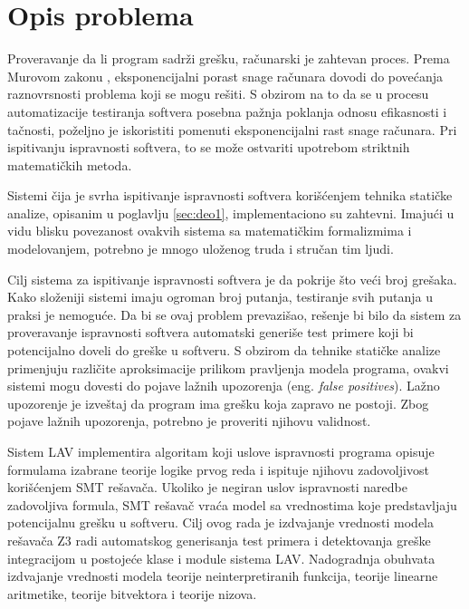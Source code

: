 \documentclass[12pt,oneside]{memoir}
\begin{document}
\section{Opis problema} \label{sec:deo3}
Proveravanje da li program sadrži grešku, računarski je zahtevan proces. Prema Murovom zakonu \cite{Moore}, eksponencijalni porast snage računara dovodi do povećanja raznovrsnosti problema koji se mogu rešiti. 
S obzirom na to da se u procesu automatizacije testiranja softvera posebna pažnja poklanja odnosu efikasnosti i tačnosti, poželjno je iskoristiti pomenuti eksponencijalni rast snage računara. Pri ispitivanju ispravnosti softvera, to se može ostvariti upotrebom striktnih matematičkih metoda.
\par
Sistemi čija je svrha ispitivanje ispravnosti softvera korišćenjem tehnika statičke analize, opisanim u poglavlju \ref{sec:deo1}, implementaciono su zahtevni. Imajući u vidu blisku povezanost ovakvih sistema sa matematičkim formalizmima i modelovanjem, potrebno je mnogo uloženog truda i stručan tim ljudi. 
\par 
Cilj sistema za ispitivanje ispravnosti softvera je da pokrije što veći broj grešaka. Kako složeniji sistemi imaju ogroman broj putanja, testiranje svih putanja u praksi je nemoguće. Da bi se ovaj problem prevazišao, rešenje bi bilo da sistem za proveravanje ispravnosti softvera automatski generiše test primere koji bi potencijalno doveli do greške u softveru. S obzirom da tehnike statičke analize primenjuju različite aproksimacije prilikom pravljenja modela programa, ovakvi sistemi mogu dovesti do pojave lažnih upozorenja (eng. \textit{false positives}). Lažno upozorenje je izveštaj da program ima grešku koja zapravo ne postoji. Zbog pojave lažnih upozorenja, potrebno je proveriti njihovu validnost.
\par
Sistem LAV implementira algoritam koji uslove ispravnosti programa opisuje formulama izabrane teorije logike prvog reda i ispituje njihovu zadovoljivost korišćenjem SMT rešavača. Ukoliko je negiran uslov ispravnosti naredbe zadovoljiva formula, SMT rešavač vraća model sa vrednostima koje predstavljaju potencijalnu grešku u softveru. Cilj ovog rada je izdvajanje vrednosti modela rešavača Z3 radi automatskog generisanja test primera i detektovanja greške integracijom u postojeće klase i module sistema LAV. Nadogradnja obuhvata izdvajanje vrednosti modela teorije neinterpretiranih funkcija, teorije linearne aritmetike, teorije bitvektora i teorije nizova.
\end{document}
